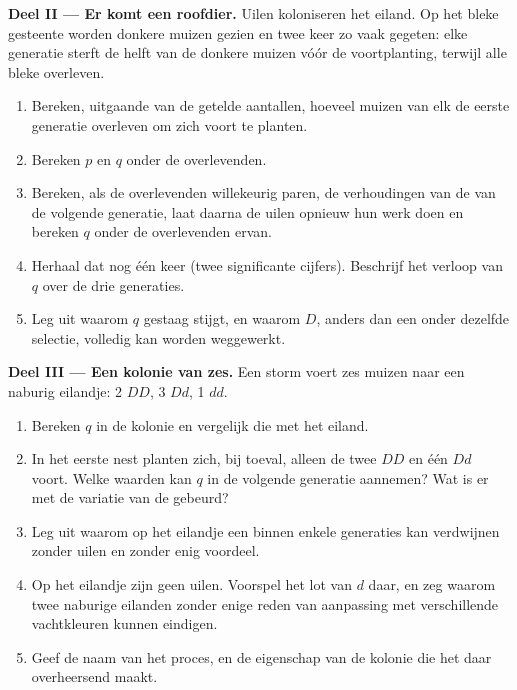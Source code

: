 \begin{problem}
\medskip
\noindent\textbf{Deel II --- Er komt een roofdier.}
Uilen koloniseren het eiland. Op het bleke gesteente worden donkere muizen
gezien en twee keer zo vaak gegeten: elke generatie sterft de helft van de
donkere muizen vóór de voortplanting, terwijl alle bleke overleven.
\begin{enumerate}[resume]
  \item Bereken, uitgaande van de getelde aantallen, hoeveel muizen van
        elk  de eerste generatie overleven om zich voort te
        planten.
  \item Bereken $p$ en $q$ onder de overlevenden.
  \item Bereken, als de overlevenden willekeurig paren, de verhoudingen
        van de  van de volgende generatie, laat daarna de uilen
        opnieuw hun werk doen en bereken $q$ onder de overlevenden ervan.
  \item Herhaal dat nog één keer (twee significante cijfers). Beschrijf
        het verloop van $q$ over de drie generaties.
  \item Leg uit waarom $q$ gestaag stijgt, en waarom $D$, anders dan een
          onder dezelfde selectie, volledig kan worden
        weggewerkt.
\end{enumerate}

\medskip
\noindent\textbf{Deel III --- Een kolonie van zes.}
Een storm voert zes muizen naar een naburig eilandje: 2 $DD$, 3 $Dd$, 1 $dd$.
\begin{enumerate}[resume]
  \item Bereken $q$ in de kolonie en vergelijk die met het eiland.
  \item In het eerste nest planten zich, bij toeval, alleen de twee $DD$
        en één $Dd$ voort. Welke waarden kan $q$ in de volgende generatie
        aannemen? Wat is er met de variatie van de  gebeurd?
  \item Leg uit waarom op het eilandje een  binnen enkele generaties
        kan verdwijnen zonder uilen en zonder enig voordeel.
  \item Op het eilandje zijn geen uilen. Voorspel het lot van $d$ daar, en
        zeg waarom twee naburige eilanden zonder enige reden van
        aanpassing met verschillende vachtkleuren kunnen eindigen.
  \item Geef de naam van het proces, en de eigenschap van de kolonie die
        het daar overheersend maakt.
\end{enumerate}


\end{problem}
